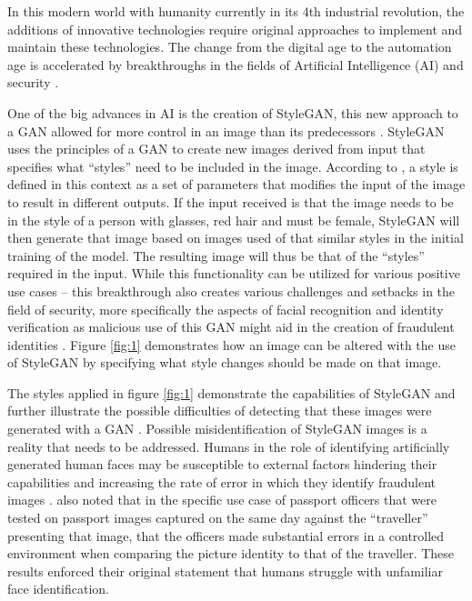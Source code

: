 In this modern world with humanity currently in its 4th industrial revolution, the additions of innovative technologies require original approaches to implement and maintain these technologies. The change from the digital age to the automation age is accelerated by breakthroughs in the fields of Artificial Intelligence (AI) and security \citep{Skilton2017}.

One of the big advances in AI is the creation of StyleGAN, this new approach to a GAN allowed for more control in an image than its predecessors \citep{Karras2019}. StyleGAN uses the principles of a GAN to create new images derived from input that specifies what “styles” need to be included in the image. According to \cite{Karras2019}, a style is defined in this context as a set of parameters that modifies the input of the image to result in different outputs. If the input received is that the image needs to be in the style of a person with glasses, red hair and must be female, StyleGAN will then generate that image based on images used of that similar styles in the initial training of the model. The resulting image will thus be that of the “styles” required in the input. While this functionality can be utilized for various positive use cases – this breakthrough also creates various challenges and setbacks in the field of security, more specifically the aspects of facial recognition and identity verification as malicious use of this GAN might aid in the creation of fraudulent identities \citep{Mitra2021}. Figure \ref{fig:1} demonstrates how an image can be altered with the use of StyleGAN by specifying what style changes should be made on that image.

The styles applied in figure \ref{fig:1} demonstrate the capabilities of StyleGAN and further illustrate the possible difficulties of detecting that these images were generated with a GAN \citep{Karras2019}. Possible misidentification of StyleGAN images is a reality that needs to be addressed. Humans in the role of identifying artificially generated human faces may be susceptible to external factors hindering their capabilities and increasing the rate of error in which they identify fraudulent images \citep{Fysh2018}. \cite{Fysh2018} also noted that in the specific use case of passport officers that were tested on passport images captured on the same day against the “traveller” presenting that image, that the officers made substantial errors in a controlled environment when comparing the picture identity to that of the traveller. These results enforced their original statement that humans struggle with unfamiliar face identification.

